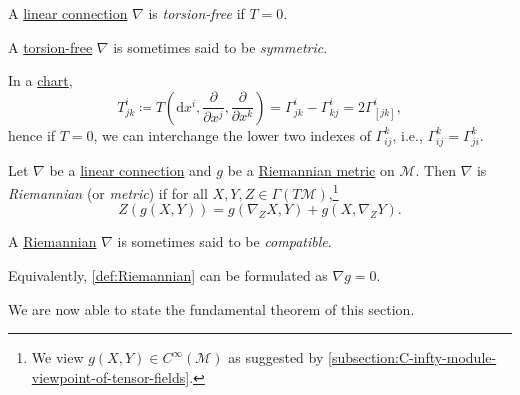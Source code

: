 \begin{definition}\label{def:torsion-free}
	A \hyperref[def:linear-connection]{linear connection} \(\nabla \) is \emph{torsion-free} if \(T = 0\).
\end{definition}

\begin{notation}[symmetric]
	A \hyperref[def:torsion-free]{torsion-free} \(\nabla \) is sometimes said to be \emph{symmetric}.
\end{notation}

In a \hyperref[def:coordinate-chart]{chart},
\[
	T^i_{jk} \coloneqq T\left( \mathrm{d} x^i, \frac{\partial }{\partial x^j} , \frac{\partial }{\partial x^k} \right) = \Gamma ^i_{jk} - \Gamma ^i_{kj} = 2\Gamma ^i_{[jk]},
\]
hence if \(T = 0\), we can interchange the lower two indexes of \(\Gamma ^k _{ij}\), i.e., \(\Gamma ^k _{ij} = \Gamma ^k _{ji}\).

\begin{definition}[Riemannian]\label{def:Riemannian}
	Let \(\nabla \) be a \hyperref[def:linear-connection]{linear connection} and \(g\) be a \hyperref[def:Riemannian-metric]{Riemannian metric} on \(\mathcal{M} \). Then \(\nabla \) is \emph{Riemannian} (or \emph{metric}) if for all \(X, Y, Z\in \Gamma (T\mathcal{M} )\),\footnote{We view \(g(X, Y)\in C^{\infty} (\mathcal{M} )\) as suggested by \autoref{subsection:C-infty-module-viewpoint-of-tensor-fields}.}
	\[
		Z(g(X, Y)) = g(\nabla _{Z} X, Y) + g(X, \nabla _{Z} Y).
	\]
\end{definition}

\begin{notation}[Compatible]
	A \hyperref[def:Riemannian]{Riemannian} \(\nabla \) is sometimes said to be \emph{compatible}.
\end{notation}

\begin{remark}
	Equivalently, \autoref{def:Riemannian} can be formulated as \(\nabla g = 0\).
\end{remark}

We are now able to state the fundamental theorem of this section.

